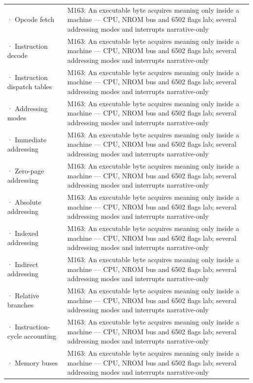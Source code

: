 {\begin{longtable}[]{@{}
  >{\raggedright\arraybackslash}p{}
  >{\raggedright\arraybackslash}p{}@{}}
2706 · Opcode fetch & M163: An executable byte acquires meaning only inside a machine --- CPU, NROM bus and 6502 flags lab; several addressing modes and interrupts narrative-only \\
2707 · Instruction decode & M163: An executable byte acquires meaning only inside a machine --- CPU, NROM bus and 6502 flags lab; several addressing modes and interrupts narrative-only \\
2708 · Instruction dispatch tables & M163: An executable byte acquires meaning only inside a machine --- CPU, NROM bus and 6502 flags lab; several addressing modes and interrupts narrative-only \\
2709 · Addressing modes & M163: An executable byte acquires meaning only inside a machine --- CPU, NROM bus and 6502 flags lab; several addressing modes and interrupts narrative-only \\
2710 · Immediate addressing & M163: An executable byte acquires meaning only inside a machine --- CPU, NROM bus and 6502 flags lab; several addressing modes and interrupts narrative-only \\
2711 · Zero-page addressing & M163: An executable byte acquires meaning only inside a machine --- CPU, NROM bus and 6502 flags lab; several addressing modes and interrupts narrative-only \\
2712 · Absolute addressing & M163: An executable byte acquires meaning only inside a machine --- CPU, NROM bus and 6502 flags lab; several addressing modes and interrupts narrative-only \\
2713 · Indexed addressing & M163: An executable byte acquires meaning only inside a machine --- CPU, NROM bus and 6502 flags lab; several addressing modes and interrupts narrative-only \\
2714 · Indirect addressing & M163: An executable byte acquires meaning only inside a machine --- CPU, NROM bus and 6502 flags lab; several addressing modes and interrupts narrative-only \\
2715 · Relative branches & M163: An executable byte acquires meaning only inside a machine --- CPU, NROM bus and 6502 flags lab; several addressing modes and interrupts narrative-only \\
2716 · Instruction-cycle accounting & M163: An executable byte acquires meaning only inside a machine --- CPU, NROM bus and 6502 flags lab; several addressing modes and interrupts narrative-only \\
2717 · Memory buses & M163: An executable byte acquires meaning only inside a machine --- CPU, NROM bus and 6502 flags lab; several addressing modes and interrupts narrative-only \\

\end{longtable}}
